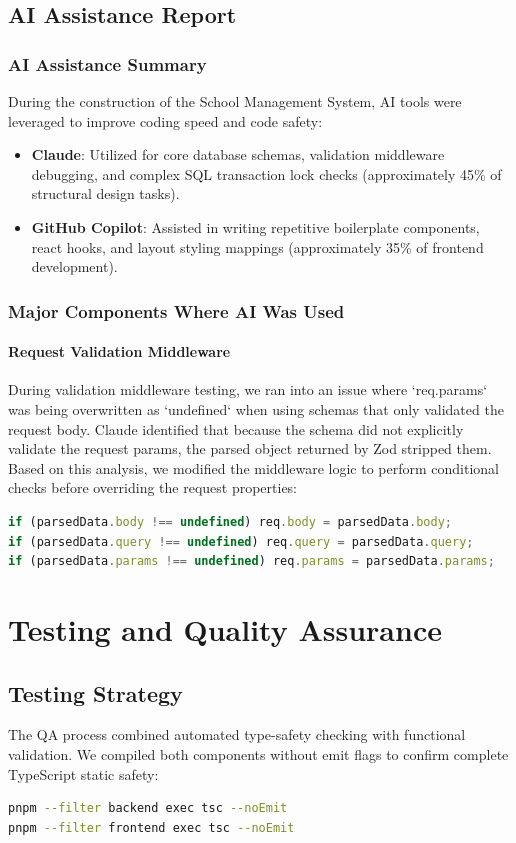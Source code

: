 \documentclass[12pt,a4paper]{report}
\begin{document}
\section{AI Assistance Report}
\subsection{AI Assistance Summary}
During the construction of the School Management System, AI tools were leveraged to improve coding speed and code safety:
\begin{itemize}
    \item \textbf{Claude}: Utilized for core database schemas, validation middleware debugging, and complex SQL transaction lock checks (approximately 45\% of structural design tasks).
    \item \textbf{GitHub Copilot}: Assisted in writing repetitive boilerplate components, react hooks, and layout styling mappings (approximately 35\% of frontend development).
\end{itemize}

\subsection{Major Components Where AI Was Used}
\subsubsection{Request Validation Middleware}
During validation middleware testing, we ran into an issue where `req.params` was being overwritten as `undefined` when using schemas that only validated the request body. Claude identified that because the schema did not explicitly validate the request params, the parsed object returned by Zod stripped them. Based on this analysis, we modified the middleware logic to perform conditional checks before overriding the request properties:
\begin{lstlisting}[language=TypeScript, caption=validateRequest Correction]
if (parsedData.body !== undefined) req.body = parsedData.body;
if (parsedData.query !== undefined) req.query = parsedData.query;
if (parsedData.params !== undefined) req.params = parsedData.params;
\end{lstlisting}

\chapter{Testing and Quality Assurance}
\section{Testing Strategy}
The QA process combined automated type-safety checking with functional validation. We compiled both components without emit flags to confirm complete TypeScript static safety:
\begin{lstlisting}[language=bash]
pnpm --filter backend exec tsc --noEmit
pnpm --filter frontend exec tsc --noEmit
\end{lstlisting}
\end{document}
